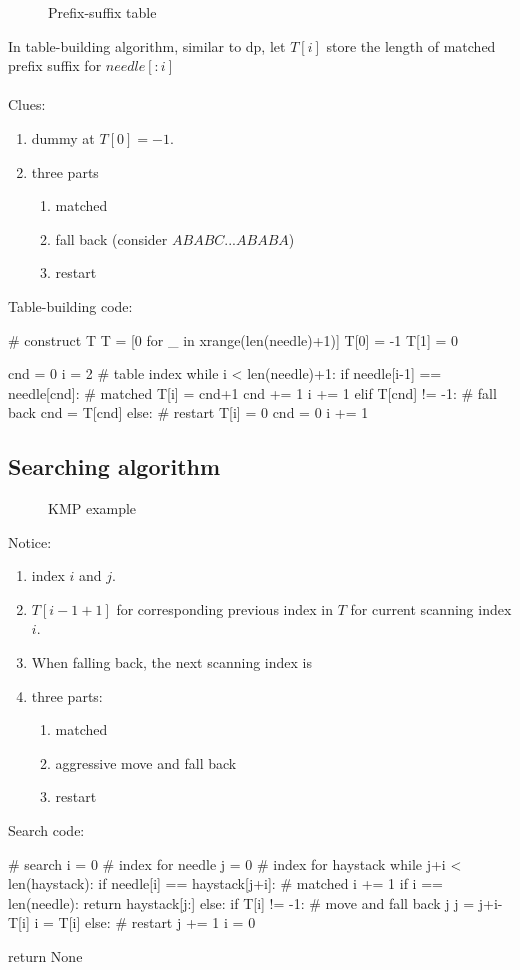 \begin{figure}[hbtp]
\centering
{}
\caption{Prefix-suffix table}
\label{fig:kmp_table}
\end{figure}
In table-building algorithm, similar to dp, let $T[i]$ store the length of matched prefix suffix for $needle[:i]$\\
\\
Clues:
\begin{enumerate}
\item dummy at $T[0]=-1$.
\item three parts
\begin{enumerate}
\item matched
\item fall back (consider $ABABC...ABABA$)
\item restart 
\end{enumerate}
\end{enumerate}
Table-building code:
\begin{python}
# construct T
T = [0 for _ in xrange(len(needle)+1)]
T[0] = -1
T[1] = 0

cnd = 0  
i = 2  # table index
while i < len(needle)+1:
    if needle[i-1] == needle[cnd]:  # matched
        T[i] = cnd+1
        cnd += 1
        i += 1
    elif T[cnd] != -1:  # fall back 
        cnd = T[cnd]
    else:  # restart 
        T[i] = 0
        cnd = 0
        i += 1
\end{python}
\subsection{Searching algorithm}
\begin{figure}[F]
\centering
{}
\caption{KMP example}
\label{fig:kmp_presuffix}
\end{figure}

Notice:
\begin{enumerate}
\item index $i$ and $j$.
\item $T[i-1+1]$ for corresponding previous index in $T$ for current scanning index $i$. 
\item When falling back, the next scanning index is 
\item three parts:
\begin{enumerate}
\item matched
\item aggressive move and fall back
\item restart 
\end{enumerate}
\end{enumerate}
Search code: 
\begin{python}
# search
i = 0  # index for needle 
j = 0  # index for haystack
while j+i < len(haystack):
    if needle[i] == haystack[j+i]:  # matched 
        i += 1
        if i == len(needle):
            return haystack[j:]
    else:
        if T[i] != -1:  # move and fall back j
            j = j+i-T[i]
            i = T[i]
        else:  # restart
            j += 1
            i = 0

return None
\end{python}
